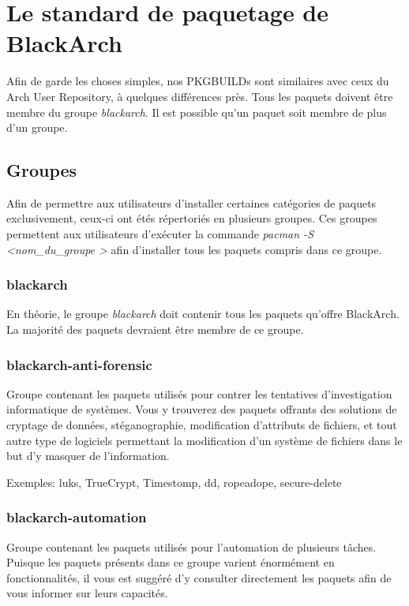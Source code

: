 \documentclass[a4paper, oneside, 11pt]{book}
\begin{document}
\section{Le standard de paquetage de BlackArch}

Afin de garde les choses simples, nos PKGBUILDs sont similaires avec ceux du
Arch User Repository, à quelques différences près. Tous les paquets doivent
être membre du groupe \textit{blackarch}. Il est possible qu'un paquet soit
membre de plus d'un groupe.

\subsection{Groupes}

Afin de permettre aux utilisateurs d'installer certaines catégories de paquets
exclusivement, ceux-ci ont étés répertoriés en plusieurs groupes. Ces groupes
permettent aux utilisateurs d'exécuter la commande 
\textit{pacman -S \textless nom\_du\_groupe \textgreater } afin d'installer tous
 les paquets compris dans ce groupe.

\subsubsection{blackarch}

En théorie, le groupe \textit{blackarch} doit contenir tous les paquets qu'offre
BlackArch. La majorité des paquets devraient être membre de ce groupe.

\subsubsection{blackarch-anti-forensic}

Groupe contenant les paquets utilisés pour contrer les tentatives 
d'investigation informatique de systèmes. Vous y trouverez des paquets offrants
des solutions de cryptage de données, stéganographie, modification d'attributs 
de fichiers, et tout autre type de logiciels permettant la modification d'un
système de fichiers dans le but d'y masquer de l'information.

Exemples: luks, TrueCrypt, Timestomp, dd, ropeadope, secure-delete

\subsubsection{blackarch-automation}

Groupe contenant les paquets utilisés pour l'automation de plusieurs tâches.
Puisque les paquets présents dans ce groupe varient énormément en 
fonctionnalités, il vous est suggéré d'y consulter directement les paquets
afin de vous informer sur leurs capacités.
\end{document}
